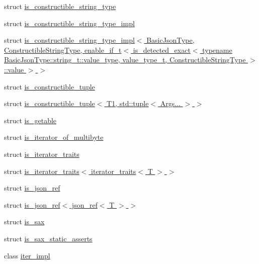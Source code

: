 \begin{DoxyCompactItemize}
\item 
struct \hyperlink{structnlohmann_1_1detail_1_1is__constructible__string__type}{is\+\_\+constructible\+\_\+string\+\_\+type}
\item 
struct \hyperlink{structnlohmann_1_1detail_1_1is__constructible__string__type__impl}{is\+\_\+constructible\+\_\+string\+\_\+type\+\_\+impl}
\item 
struct \hyperlink{structnlohmann_1_1detail_1_1is__constructible__string__type__impl_3_01BasicJsonType_00_01Construe4743afb22172cdb3c5f428800835387}{is\+\_\+constructible\+\_\+string\+\_\+type\+\_\+impl$<$ Basic\+Json\+Type, Constructible\+String\+Type, enable\+\_\+if\+\_\+t$<$ is\+\_\+detected\+\_\+exact$<$ typename Basic\+Json\+Type\+::string\+\_\+t\+::value\+\_\+type, value\+\_\+type\+\_\+t, Constructible\+String\+Type $>$\+::value $>$ $>$}
\item 
struct \hyperlink{structnlohmann_1_1detail_1_1is__constructible__tuple}{is\+\_\+constructible\+\_\+tuple}
\item 
struct \hyperlink{structnlohmann_1_1detail_1_1is__constructible__tuple_3_01T1_00_01std_1_1tuple_3_01Args_8_8_8_01_4_01_4}{is\+\_\+constructible\+\_\+tuple$<$ T1, std\+::tuple$<$ Args... $>$ $>$}
\item 
struct \hyperlink{structnlohmann_1_1detail_1_1is__getable}{is\+\_\+getable}
\item 
struct \hyperlink{structnlohmann_1_1detail_1_1is__iterator__of__multibyte}{is\+\_\+iterator\+\_\+of\+\_\+multibyte}
\item 
struct \hyperlink{structnlohmann_1_1detail_1_1is__iterator__traits}{is\+\_\+iterator\+\_\+traits}
\item 
struct \hyperlink{structnlohmann_1_1detail_1_1is__iterator__traits_3_01iterator__traits_3_01T_01_4_01_4}{is\+\_\+iterator\+\_\+traits$<$ iterator\+\_\+traits$<$ T $>$ $>$}
\item 
struct \hyperlink{structnlohmann_1_1detail_1_1is__json__ref}{is\+\_\+json\+\_\+ref}
\item 
struct \hyperlink{structnlohmann_1_1detail_1_1is__json__ref_3_01json__ref_3_01T_01_4_01_4}{is\+\_\+json\+\_\+ref$<$ json\+\_\+ref$<$ T $>$ $>$}
\item 
struct \hyperlink{structnlohmann_1_1detail_1_1is__sax}{is\+\_\+sax}
\item 
struct \hyperlink{structnlohmann_1_1detail_1_1is__sax__static__asserts}{is\+\_\+sax\+\_\+static\+\_\+asserts}
\item 
class \hyperlink{classnlohmann_1_1detail_1_1iter__impl}{iter\+\_\+impl}

\end{DoxyCompactItemize}
